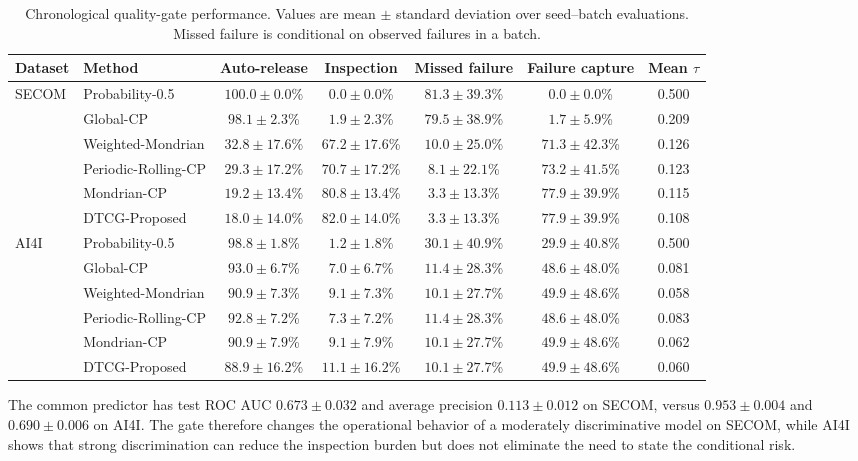 \documentclass[journal]{IEEEtran}
\begin{document}
\begin{table}[t]
\centering
\caption{Chronological quality-gate performance. Values are mean $\pm$ standard deviation over seed--batch evaluations. Missed failure is conditional on observed failures in a batch.}
\label{tab:main}
\small
\begin{tabular}{llccccc}
\toprule
Dataset & Method & Auto-release & Inspection & Missed failure & Failure capture & Mean $\tau$ \\
\midrule
\multirow{6}{*}{SECOM}
& Probability-0.5 & $100.0\pm0.0$\% & $0.0\pm0.0$\% & $81.3\pm39.3$\% & $0.0\pm0.0$\% & 0.500 \\
& Global-CP & $98.1\pm2.3$\% & $1.9\pm2.3$\% & $79.5\pm38.9$\% & $1.7\pm5.9$\% & 0.209 \\
& Weighted-Mondrian & $32.8\pm17.6$\% & $67.2\pm17.6$\% & $10.0\pm25.0$\% & $71.3\pm42.3$\% & 0.126 \\
& Periodic-Rolling-CP & $29.3\pm17.2$\% & $70.7\pm17.2$\% & $8.1\pm22.1$\% & $73.2\pm41.5$\% & 0.123 \\
& Mondrian-CP & $19.2\pm13.4$\% & $80.8\pm13.4$\% & $3.3\pm13.3$\% & $77.9\pm39.9$\% & 0.115 \\
& DTCG-Proposed & $18.0\pm14.0$\% & $82.0\pm14.0$\% & $3.3\pm13.3$\% & $77.9\pm39.9$\% & 0.108 \\
\midrule
\multirow{6}{*}{AI4I}
& Probability-0.5 & $98.8\pm1.8$\% & $1.2\pm1.8$\% & $30.1\pm40.9$\% & $29.9\pm40.8$\% & 0.500 \\
& Global-CP & $93.0\pm6.7$\% & $7.0\pm6.7$\% & $11.4\pm28.3$\% & $48.6\pm48.0$\% & 0.081 \\
& Weighted-Mondrian & $90.9\pm7.3$\% & $9.1\pm7.3$\% & $10.1\pm27.7$\% & $49.9\pm48.6$\% & 0.058 \\
& Periodic-Rolling-CP & $92.8\pm7.2$\% & $7.3\pm7.2$\% & $11.4\pm28.3$\% & $48.6\pm48.0$\% & 0.083 \\
& Mondrian-CP & $90.9\pm7.9$\% & $9.1\pm7.9$\% & $10.1\pm27.7$\% & $49.9\pm48.6$\% & 0.062 \\
& DTCG-Proposed & $88.9\pm16.2$\% & $11.1\pm16.2$\% & $10.1\pm27.7$\% & $49.9\pm48.6$\% & 0.060 \\
\bottomrule
\end{tabular}
\end{table}

The common predictor has test ROC AUC $0.673\pm0.032$ and average precision $0.113\pm0.012$ on SECOM, versus $0.953\pm0.004$ and $0.690\pm0.006$ on AI4I. The gate therefore changes the operational behavior of a moderately discriminative model on SECOM, while AI4I shows that strong discrimination can reduce the inspection burden but does not eliminate the need to state the conditional risk.
\end{document}
